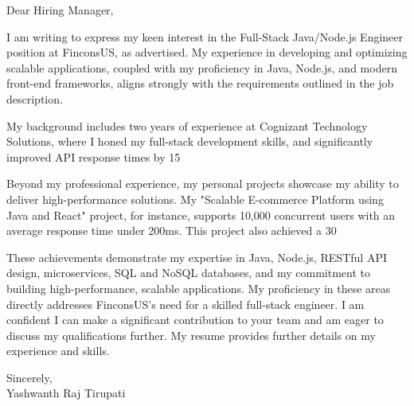 \documentclass[letterpaper,11pt]{article}
\begin{document}
\begin{flushleft}
Dear Hiring Manager,

\vspace{12pt}

I am writing to express my keen interest in the Full-Stack Java/Node.js Engineer position at FinconsUS, as advertised.  My experience in developing and optimizing scalable applications, coupled with my proficiency in Java, Node.js, and modern front-end frameworks, aligns strongly with the requirements outlined in the job description.

\vspace{12pt}

My background includes two years of experience at Cognizant Technology Solutions, where I honed my full-stack development skills, and significantly improved API response times by 15%

\vspace{12pt}

Beyond my professional experience, my personal projects showcase my ability to deliver high-performance solutions.  My "Scalable E-commerce Platform using Java and React" project, for instance, supports 10,000 concurrent users with an average response time under 200ms. This project also achieved a 30%

\vspace{12pt}

These achievements demonstrate my expertise in Java, Node.js, RESTful API design, microservices, SQL and NoSQL databases, and my commitment to building high-performance, scalable applications. My  proficiency in these areas directly addresses FinconsUS's need for a skilled full-stack engineer. I am confident I can make a significant contribution to your team and am eager to discuss my qualifications further.  My resume provides further details on my experience and skills.

\vspace{20pt}

Sincerely, \\
\vspace{15pt}
Yashwanth Raj Tirupati

\end{flushleft}
\end{document}
